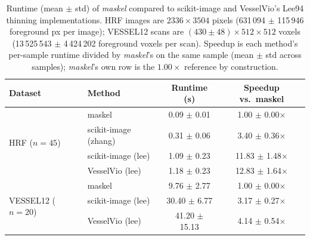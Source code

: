 \begin{table}[t]
\centering
\begin{tabular}{llcc}
\toprule
Dataset & Method & Runtime (s) & Speedup vs.\ maskel \\
\midrule
\multirow{4}{*}{HRF ($n=45$)} & maskel & 0.09 $\pm$ 0.01 & 1.00 $\pm$ 0.00$\times$ \\
 & scikit-image (zhang) & 0.31 $\pm$ 0.06 & 3.40 $\pm$ 0.36$\times$ \\
 & scikit-image (lee) & 1.09 $\pm$ 0.23 & 11.83 $\pm$ 1.48$\times$ \\
 & VesselVio (lee) & 1.18 $\pm$ 0.23 & 12.83 $\pm$ 1.64$\times$ \\
\midrule
\multirow{3}{*}{VESSEL12 ($n=20$)} & maskel & 9.76 $\pm$ 2.77 & 1.00 $\pm$ 0.00$\times$ \\
 & scikit-image (lee) & 30.40 $\pm$ 6.77 & 3.17 $\pm$ 0.27$\times$ \\
 & VesselVio (lee) & 41.20 $\pm$ 15.13 & 4.14 $\pm$ 0.54$\times$ \\
\bottomrule
\end{tabular}
\caption{Runtime (mean $\pm$ std) of \emph{maskel} compared to scikit-image and VesselVio's Lee94 thinning implementations. HRF images are $2336\times3504$ pixels (631\,094 $\pm$ 115\,946 foreground px per image); VESSEL12 scans are $(430 \pm 48)\times512\times512$ voxels (13\,525\,543 $\pm$ 4\,424\,202 foreground voxels per scan). Speedup is each method's per-sample runtime divided by \emph{maskel}'s on the same sample (mean $\pm$ std across samples); \emph{maskel}'s own row is the $1.00\times$ reference by construction.}
\label{tab:benchmark-runtime}
\end{table}
